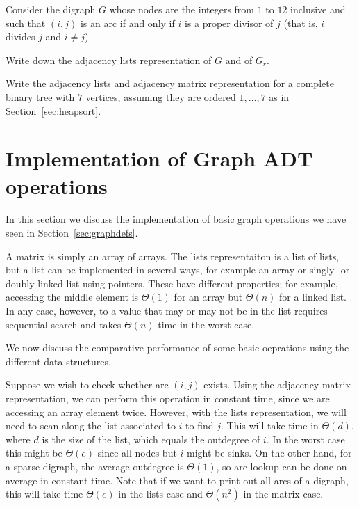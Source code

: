 \begin{Exercise}[2003SC]
\label{ex:divisible}

Consider the digraph $G$ whose nodes are the integers from $1$ to $12$
inclusive and such that $(i, j)$ is an arc if and only if $i$ is a
proper divisor of $j$ (that is, $i$ divides $j$ and $i\neq j$).

Write down the adjacency lists representation of $G$ and of $G_r$.

\begin{Exercise} \label{ex:heaprep} 
Write the adjacency lists
and adjacency matrix representation for a complete binary tree
with $7$ vertices, assuming they are ordered $1, \dots, 7$ as in
Section~\ref{sec:heapsort}.

\end{Exercise}

\end{Exercise}


\section{Implementation of Graph ADT operations}
\label{sec:graphadtimpl}

In this section we discuss the implementation of basic graph operations 
we have seen in Section~\ref{sec:graphdefs}.



A matrix is simply an array of arrays. The lists representaiton is
a list of lists, but a list can be implemented in several ways, for
example an array or singly- or doubly-linked list using pointers. These
have different properties; for example, accessing the middle element is
$\Theta(1)$ for an array but $\Theta(n)$ for a linked list. In any case,
however, to  a value that may or may not be in the list
requires sequential search and takes $\Theta(n)$ time in the worst case.

We now discuss the comparative performance of some basic oeprations
using the  different data structures.

Suppose we wish to check whether arc $(i,j)$ exists. Using the adjacency
matrix representation, we can perform this operation in constant time,
since we are accessing an array element twice. However, with the lists
representation, we will need to scan along the list associated to $i$
to find $j$. This will take time in $\Theta(d)$, where $d$ is the size
of the list, which equals the outdegree of $i$. In the worst case this
might be $\Theta(e)$ since all nodes but $i$ might be sinks. On the
other hand, for a sparse digraph, the average outdegree is $\Theta(1)$,
so arc lookup can be done on average in constant time. Note that if we
want to print out all arcs of a digraph, this will take time $\Theta(e)$
in the lists case and $\Theta(n^2)$ in the matrix case.

